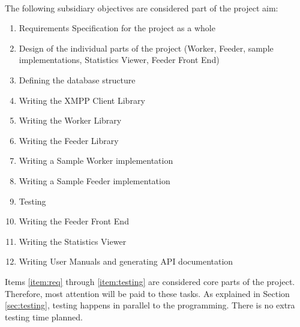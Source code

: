 \paragraph{}
The following subsidiary objectives are considered part of the project aim:
\begin{enumerate}
\item \label{item:req} Requirements Specification for the project as a whole
\item \label{item:design} Design of the individual parts of the project (Worker, Feeder, sample implementations, Statistics Viewer, Feeder Front End)
\item \label{item:db} Defining the database structure
\item \label{item:client} Writing the XMPP Client Library
\item \label{item:worker} Writing the Worker Library
\item \label{item:feeder} Writing the Feeder Library
\item \label{item:samplF} Writing a Sample Worker implementation
\item \label{item:samplW} Writing a Sample Feeder implementation
\item \label{item:testing} Testing
\item \label{item:frontend} Writing the Feeder Front End
\item \label{item:viewer} Writing the Statistics Viewer
\item \label{item:manual} Writing User Manuals and generating API documentation
\end{enumerate}
Items \ref{item:req} through \ref{item:testing} are considered core parts of the project. Therefore, most attention will be paid to these tasks. As explained in Section \ref{sec:testing}, testing happens in parallel to the programming. There is no extra testing time planned.
